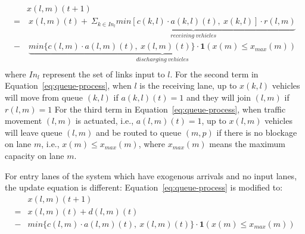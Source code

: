 \begin{equation}
\begin{split}
\label{eq:queue-process}
      & x(l,m)(t+1) \\
    = &\ x(l,m)(t) + \ \underbrace{ \Sigma_{k\in In_l} min[c(k,l)\cdot a(k,l)(t),\ x(k,l)]\cdot r(l,m)}_{receiving\ vehicles}\\
    - &\ \underbrace{ min\{c(l,m)\cdot a(l,m)(t),\ x(l,m)(t)\}\cdot \mathbf{1}(x(m)\le x_{max}(m))}_{discharging\ vehicles} \\
\end{split}
\end{equation}
where $In_l$ represent the set of links input to $l$. For the second term in Equation~\ref{eq:queue-process}, when $l$ is the receiving lane, up to $x(k,l)$ vehicles will move from queue $(k,l)$ if $a(k,l)(t)=1$ and they will join $(l,m)$ if $r(l,m)=1$
For the third term in Equation~\ref{eq:queue-process}, when traffic movement $(l,m)$ is actuated, i.e., $a(l,m)(t)=1$, up to $x(l,m)$ vehicles will leave queue $(l,m)$ and be routed to queue $(m,p)$ if there is no blockage on lane $m$, i.e., $x(m)\leq x_{max}(m)$, where $x_{max}(m)$ means the maximum capacity on lane $m$. 


For entry lanes of the system which have exogenous arrivals and no input lanes, the update equation is different: Equation~\ref{eq:queue-process} is modified to:
\begin{equation}
\begin{split}
\label{eq:queue-process-entry}
      & x(l,m)(t+1) \\
    = & x(l,m)(t) +  d(l,m)(t)\\
    - & min\{c(l,m)\cdot a(l,m)(t),\ x(l,m)(t)\}\cdot \mathbf{1}(x(m)\le x_{max}(m)) \\
\end{split}
\end{equation}

